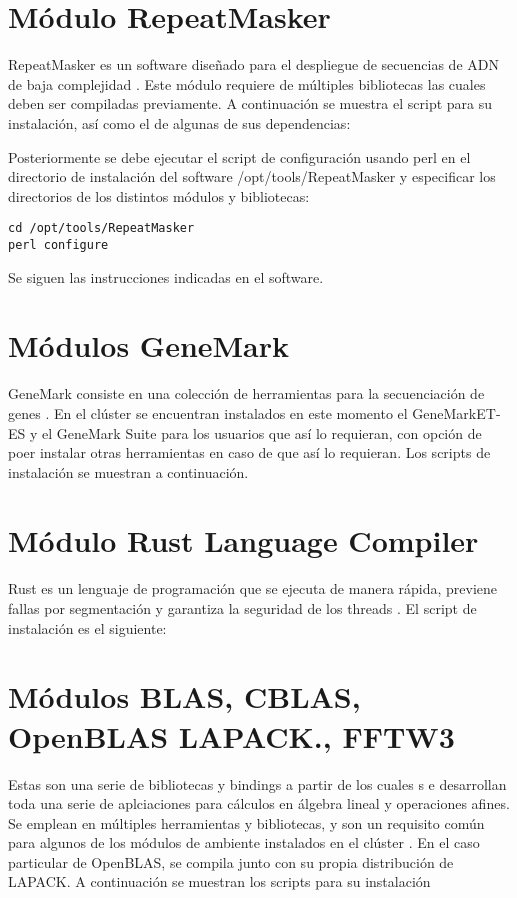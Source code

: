 

\section{Módulo RepeatMasker}
RepeatMasker es un software diseñado para el despliegue de secuencias de ADN de baja complejidad \cite{repeatmasker}. Este módulo requiere de múltiples bibliotecas las cuales deben ser compiladas previamente. A continuación se muestra el script para su instalación, así como el de algunas de sus dependencias:


 


Posteriormente se debe ejecutar el script de configuración usando perl en el directorio de instalación del software /opt/tools/RepeatMasker y especificar los directorios de los distintos módulos y bibliotecas:

\begin{lstlisting}
cd /opt/tools/RepeatMasker
perl configure
\end{lstlisting}

Se siguen las instrucciones indicadas en el software.

\section{Módulos GeneMark}
GeneMark consiste en una colección de herramientas para la secuenciación de genes \cite{genemark}. En el clúster se encuentran instalados en este momento el GeneMarkET-ES y el GeneMark Suite para los usuarios que así lo requieran, con opción de poer instalar otras herramientas en caso de que así lo requieran. Los scripts de instalación se muestran a continuación.




\section{Módulo Rust Language Compiler}
Rust es un lenguaje de programación que se ejecuta de manera rápida, previene fallas por segmentación y garantiza la seguridad de los threads \cite{rust}. El script de instalación es el siguiente:



\section{Módulos BLAS, CBLAS, OpenBLAS LAPACK., FFTW3}
Estas son una serie de bibliotecas y bindings a partir de los cuales s e desarrollan toda una serie de aplciaciones para cálculos en álgebra lineal y operaciones afines. Se emplean en múltiples herramientas y bibliotecas, y son un requisito común para algunos de los módulos de ambiente instalados en el clúster \cite{blas}\cite{lapack}\cite{fftw}\cite{openblas}. En el caso particular de OpenBLAS, se compila junto con su propia distribución de LAPACK. A continuación se muestran los scripts para su instalación

